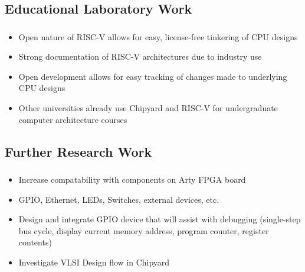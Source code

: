 \documentclass{eceday}
\begin{document}
\subsection{Educational Laboratory Work}\label{subsec:Educational_Lab_Work}
\begin{frame}
  \frametitle{}
  \begin{itemize}
  \item Open nature of RISC-V allows for easy, license-free tinkering of CPU designs
  \item Strong documentation of RISC-V architectures due to industry use
  \item Open development allows for easy tracking of changes made to underlying CPU designs
  \item Other universities already use Chipyard and RISC-V for undergraduate computer architecture courses
  \end{itemize}
\end{frame}

\subsection{Further Research Work}\label{subsec:Further_Research_Work}
\begin{frame}
  \frametitle{}
  \begin{itemize}
  	\item Increase compatability with components on Arty FPGA board
  	\item GPIO, Ethernet, LEDs, Switches, external devices, etc.
  	\item Design and integrate GPIO device that will assist with debugging (single-step bus cycle, display current memory address, program counter, register contents)
  	\item Investigate VLSI Design flow in Chipyard
  	
  \end{itemize}
\end{frame}
\end{document}
